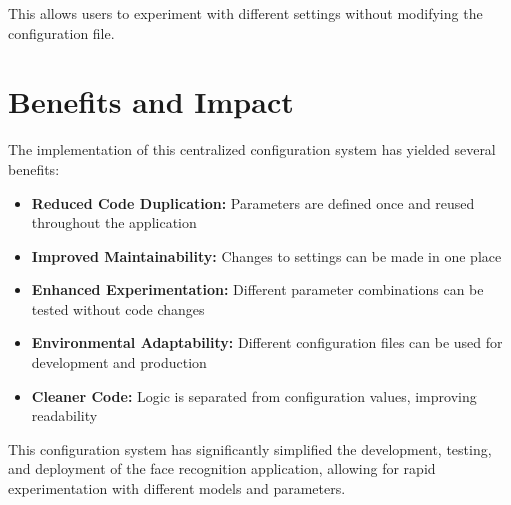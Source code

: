 This allows users to experiment with different settings without modifying the configuration file.

\section{Benefits and Impact}
The implementation of this centralized configuration system has yielded several benefits:

\begin{itemize}
    \item \textbf{Reduced Code Duplication:} Parameters are defined once and reused throughout the application
    \item \textbf{Improved Maintainability:} Changes to settings can be made in one place
    \item \textbf{Enhanced Experimentation:} Different parameter combinations can be tested without code changes
    \item \textbf{Environmental Adaptability:} Different configuration files can be used for development and production
    \item \textbf{Cleaner Code:} Logic is separated from configuration values, improving readability
\end{itemize}

This configuration system has significantly simplified the development, testing, and deployment of the face recognition application, allowing for rapid experimentation with different models and parameters.
